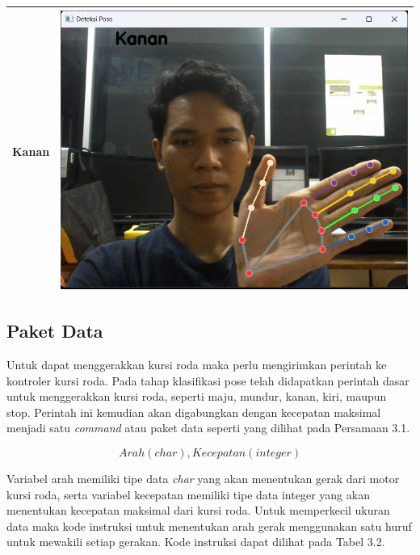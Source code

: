 \begin{table}[H]
\begin{tabular}{|c|c|}
        Kanan               & \includegraphics[scale=0.33]{gambar/bab3/Kanan.png}  \\ \hline
    \end{tabular}
\end{table}

\subsection{Paket Data}
Untuk dapat menggerakkan kursi roda maka perlu mengirimkan perintah ke kontroler kursi roda. Pada tahap klasifikasi pose telah didapatkan perintah dasar untuk menggerakkan kursi roda, seperti maju, mundur, kanan, kiri, maupun stop. Perintah ini kemudian akan digabungkan dengan kecepatan maksimal menjadi satu \emph{command} atau paket data seperti yang dilihat pada Persamaan 3.1.

\begin{equation}
    Arah(char),Kecepatan(integer)
\end{equation}

Variabel arah memiliki tipe data \emph{char} yang akan menentukan gerak dari motor kursi roda, serta variabel kecepatan memiliki tipe data integer yang akan menentukan kecepatan maksimal dari kursi roda. Untuk memperkecil ukuran data maka kode instruksi untuk menentukan arah gerak menggunakan satu huruf untuk mewakili setiap gerakan. Kode instruksi dapat dilihat pada Tabel 3.2. 

